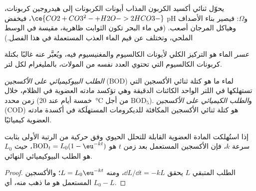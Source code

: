يحوّل ثنائي أكسيد الكربون المذاب أيونات الكربونات إلى هيدروجين كربونات، $\ce{CO2 + CO3^2- + H2O -> 2HCO3-}$،
فيخفض pH و$\Omega$: فيصير بناء الأصداف وهياكل المرجان أصعب. (في
ماء البحر تكون الثوابت ظاهرية، مقيسة في الوسط الملحي، 
وتختلف عن قيم الماء العذب المستعملة في هذا الفصل.)

\begin{definition}\label{def:b3:environmental-toxicology:hardness}
\emph{عسر} الماء هو التركيز الكلي
لأيونات الكالسيوم والمغنيسيوم فيه، ويُعبَّر عنه غالبًا بكتلة كربونات الكالسيوم
التي تحتوي العدد نفسه من المولات، بالمليغرام لكل لتر.
\end{definition}

\begin{definition}\label{def:b3:environmental-toxicology:oxygen-demand}
\emph{الطلب البيوكيميائي على الأكسجين} (BOD) لماء ما
هو كتلة ثنائي الأكسجين التي تستهلكها في اللتر الواحد الكائنات الدقيقة وهي تؤكسد
مادته العضوية في الظلام، خلال زمن محدد (خمسة أيام عند \qty{20}{\celsius} من أجل $\mathrm{BOD_5}$). 
و\emph{الطلب الكيميائي على الأكسجين} (COD) هو كتلة
ثنائي الأكسجين المكافئة للديكرومات المستهلَكة في أكسدة مادته العضوية
كيميائيًا.
\end{definition}

\begin{proposition}\label{prop:b3:environmental-toxicology:bod}
إذا استُهلكت المادة العضوية القابلة للتحلل الحيوي وفق حركية من الرتبة الأولى بثابت
سرعة $k$، فإن الأكسجين المستعمل بعد زمن $t$ هو $\mathrm{BOD}_t = L_0(1 - \eu^{-kt})$، حيث $L_0$ هو الطلب البيوكيميائي النهائي.
\end{proposition}

\begin{proof}
الطلب المتبقي $L$ يحقق $\dd L/\dd t = -kL$، ومنه $L = L_0\eu^{-kt}$؛ والأكسجين المستعمل هو ما ذهب منه،
أي $L_0 - L$.
\end{proof}

